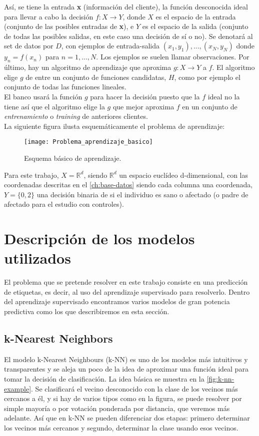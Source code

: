 Así, se tiene la entrada \textbf{x} (información del cliente), la función desconocida ideal para llevar a cabo la decisión $f:X \rightarrow Y$, donde $X$ es el espacio de la entrada (conjunto de las posibles entradas de \textbf{x}), e $Y$ es el espacio de la salida (conjunto de todas las posibles salidas, en este caso una decisión de sí o no). Se denotará al set de datos por $D$, con ejemplos de entrada-salida $(x_{1},y_{1}),...,(x_{N},y_{N})$ donde $y_{n}=f(x_{n})$ para $n=1,...,N$. Los ejemplos se suelen llamar observaciones. Por último, hay un algoritmo de aprendizaje que aproxima $g:X \rightarrow Y$ a $f$.  El algoritmo elige $g$ de entre un conjunto de funciones candidatas, $H$, como por ejemplo el conjunto de todas las funciones lineales.\\
El banco usará la función $g$ para hacer la decisión puesto que la $f$ ideal no la tiene así que el algoritmo elige la $g$ que mejor aproxima $f$ en un conjunto de \textit{entrenamiento} o \textit{training} de anteriores clientes. \cite{abu2012learning}\\
La siguiente figura ilusta esquemáticamente el problema de aprendizaje:
\begin{figure}[H]
  \centering
  \texttt{[image: Problema\_aprendizaje\_basico]}
  \caption{Esquema básico de aprendizaje.}
  \label{fig:k-nn-example}
\end{figure}

Para este trabajo, $X=\mathbb{R}^{d}$, siendo $\mathbb{R}^{d}$ un espacio euclídeo d-dimensional, con las coordenadas descritas en el \autoref{ch:base-datos} siendo cada columna una coordenada, $Y=\lbrace 0,2 \rbrace$ una decisión binaria de si el individuo es sano o afectado (o padre de afectado para el estudio con controles).

\section{Descripción de los modelos utilizados}\label{st:modelos-utilizados}
El problema que se pretende resolver en este trabajo consiste en una predicción de etiquetas, es decir, al uso del aprendizaje supervisado para resolverlo. Dentro del aprendizaje supervisado encontramos varios modelos de gran potencia predictiva como los que describiremos en esta sección.
\subsection{k-Nearest Neighbors}\label{sst:k-nn}
El modelo k-Nearest Neighbours (k-NN) es uno de los modelos más intuitivos y transparentes y se aleja un poco de la idea de aproximar una función ideal para tomar la decisión de clasificación. La idea básica se muestra en la \autoref{fig:k-nn-example}. Se clasificará el vecino desconocido con la clase de los vecinos más cercanos a él, y si hay de varios tipos como en la figura, se puede resolver por simple mayoría o por votación ponderada por distancia, que veremos más adelante. Así que en k-NN se pueden diferenciar dos etapas: primero determinar los vecinos más cercanos y segundo, determinar la clase usando esos vecinos. \cite{padraiddelany2007k}

